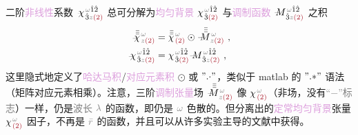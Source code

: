 二阶\textcolor{Plum}{非线性}系数 $\Xint{{}^{}_{\mathcolor{gray}{-}}}{23}{\chi}^{\;\! \mathcolor{gray}{\omega} \hat{1} \hat{2} }_{\;\! \hat{3} \mathcolor{gray}{z} \textcolor{Maroon}{(2)} }$ 总可分解为\textcolor{Plum}{均匀背景} ${\chi}^{\;\! \mathcolor{gray}{\omega} \hat{1} \hat{2} }_{\;\! \hat{3} \textcolor{Maroon}{(2)} }$ 与\textcolor{Plum}{调制函数} $\Xint{\mathcolor{gray}{-}}{18}{M}^{\;\! \mathcolor{gray}{\omega} \hat{1} \hat{2} }_{\;\! \hat{3} \mathcolor{gray}{z} \textcolor{Maroon}{(2)} }$ 之积
\begin{subequations} \label{eq:chi2-modulate}
\begin{align}
	\Xint{{}^{}_{\mathcolor{gray}{-}}}{23}{\bar{\bar{\bar{\chi}}}}^{\;\! \mathcolor{gray}{\omega} }_{\;\! \mathcolor{gray}{z} \textcolor{Maroon}{(2)} } &= \bar{\bar{\bar{\chi}}}^{\;\! \mathcolor{gray}{\omega} }_{\;\! \textcolor{Maroon}{(2)} } \odot \Xint{\mathcolor{gray}{-}}{18}{\bar{\bar{\bar{M}}}}^{\;\! \mathcolor{gray}{\omega} }_{\;\! \mathcolor{gray}{z} \textcolor{Maroon}{(2)} } ~, \label{eq:vec-eq:chi2-modulate} \\
	\Xint{{}^{}_{\mathcolor{gray}{-}}}{23}{\chi}^{\;\! \mathcolor{gray}{\omega} \hat{1} \hat{2} }_{\;\! \hat{3} \mathcolor{gray}{z} \textcolor{Maroon}{(2)} } &= {\chi}^{\;\! \mathcolor{gray}{\omega} \hat{1} \hat{2} }_{\;\! \hat{3} \textcolor{Maroon}{(2)} } \Xint{\mathcolor{gray}{-}}{18}{M}^{\;\! \mathcolor{gray}{\omega} \hat{1} \hat{2} }_{\;\! \hat{3} \mathcolor{gray}{z} \textcolor{Maroon}{(2)} } ~, \label{eq:components-eq:chi2-modulate}
\end{align}
\end{subequations}
这里隐式地定义了\textcolor{Plum}{哈达马积}/\textcolor{Plum}{对应元素积} $\odot$ 或 $"{.\cdot}"$，类似于 matlab 的 $"{.*}"$ 语法（矩阵对应元素相乘）。注意，三阶\textcolor{Plum}{调制张量}\textcolor{NavyBlue}{场} $\Xint{\mathcolor{gray}{-}}{18}{\bar{\bar{\bar{M}}}}^{\;\! \mathcolor{gray}{\omega} }_{\;\! \mathcolor{gray}{z} \textcolor{Maroon}{(2)} }$ 像 ${\chi}^{\;\! \mathcolor{gray}{\omega} }_{\;\! \textcolor{Maroon}{(2)} }$（\textcolor{NavyBlue}{非场}，没有\textcolor{gray}{“$-$”标志}）一样，仍是\textcolor{gray}{波长} $\mathcolor{gray}{\lambda}$ 的函数，即仍是 $\mathcolor{gray}{\omega}$ \textcolor{NavyBlue}{色散}的。但分离出的\textcolor{Plum}{定常}\textcolor{Plum}{均匀背景}张量 ${\chi}^{\;\! \mathcolor{gray}{\omega} }_{\;\! \textcolor{Maroon}{(2)} }$ 因子，不再是 $\mathcolor{gray}{\bar{r}}$ 的函数，并且可以从许多\textcolor{NavyBlue}{实验主导}的文献中获得\cite{nyePhysicalPropertiesCrystals2012,zuOpticalSecondHarmonic2024,zuAnalyticalNumericalModeling2022,gananyQuasiphaseMatchingLiNbO32006,segondsLinearNonlinearOptical2004,dolevLinearNonlinearOptical2009,kaschkeCalculationNonlinearOptical1989,itoGeneralizedStudyAngular1975}。

